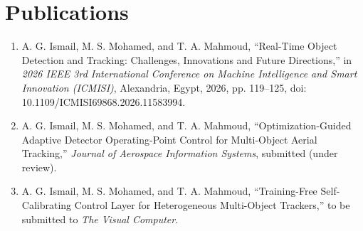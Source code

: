 \chapter*{Publications}

\begin{enumerate}
\item A. G. Ismail, M. S. Mohamed, and T. A. Mahmoud, ``Real-Time Object Detection and Tracking: Challenges, Innovations and Future Directions,'' in \emph{2026 IEEE 3rd International Conference on Machine Intelligence and Smart Innovation (ICMISI)}, Alexandria, Egypt, 2026, pp. 119--125, doi: 10.1109/ICMISI69868.2026.11583994.
\item A. G. Ismail, M. S. Mohamed, and T. A. Mahmoud, ``Optimization-Guided Adaptive Detector Operating-Point Control for Multi-Object Aerial Tracking,'' \emph{Journal of Aerospace Information Systems}, submitted (under review).
\item A. G. Ismail, M. S. Mohamed, and T. A. Mahmoud, ``Training-Free Self-Calibrating Control Layer for Heterogeneous Multi-Object Trackers,'' to be submitted to \emph{The Visual Computer}.
\end{enumerate}
